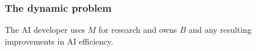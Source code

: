 \subsubsection{The dynamic problem}
\label{subsubsec:rewrite-dynamic-developer}

The AI developer uses $M$ for research and owns $B$ and any resulting improvements in AI efficiency. %

